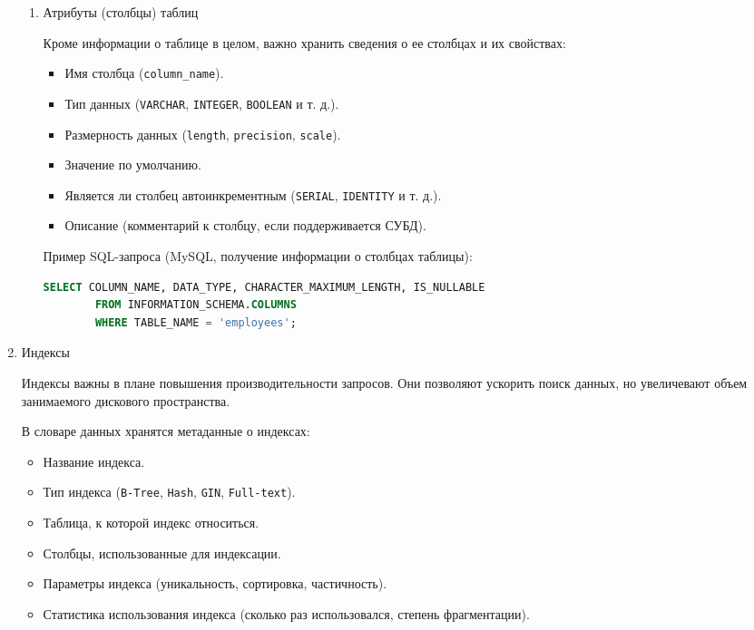 \begin{enumerate}
\begin{enumerate}
        \item Атрибуты (столбцы) таблиц
    
        Кроме информации о таблице в целом, важно хранить сведения о ее столбцах и их свойствах:
        
        \begin{itemize}
            \item Имя столбца (\texttt{column\_name}).
            \item Тип данных (\texttt{VARCHAR}, \texttt{INTEGER}, \texttt{BOOLEAN} и т. д.).
            \item Размерность данных (\texttt{length}, \texttt{precision}, \texttt{scale}).
            \item Значение по умолчанию.
            \item Является ли столбец автоинкрементным (\texttt{SERIAL}, \texttt{IDENTITY} и т. д.).
            \item Описание (комментарий к столбцу, если поддерживается СУБД).
        \end{itemize}

        Пример SQL-запроса (MySQL, получение информации о столбцах таблицы):
        \begin{lstlisting}[language=SQL]
        SELECT COLUMN_NAME, DATA_TYPE, CHARACTER_MAXIMUM_LENGTH, IS_NULLABLE 
        FROM INFORMATION_SCHEMA.COLUMNS 
        WHERE TABLE_NAME = 'employees';
        \end{lstlisting}
    \end{enumerate}
    
    \item Индексы \autocites[§51.26]{PostgreSQLdocc51}[§52.11]{PostgreSQLdocc52}[§28.3.34]{Mysqldoc1}{MicrosoftLearnSQLserverInd}

    Индексы важны в плане повышения производительности запросов. Они позволяют ускорить поиск данных, но увеличевают объем занимаемого дискового пространства.

    В словаре данных хранятся метаданные о индексах:
    \begin{itemize}
        \item Название индекса.
        \item Тип индекса (\texttt{B-Tree}, \texttt{Hash}, \texttt{GIN}, \texttt{Full-text}).
        \item Таблица, к которой индекс относиться.
        \item Столбцы, использованные для индексации.
        \item Параметры индекса (уникальность, сортировка, частичность).
        \item Статистика использования индекса (сколько раз использовался, степень фрагментации).
    \end{itemize}


\end{enumerate}
